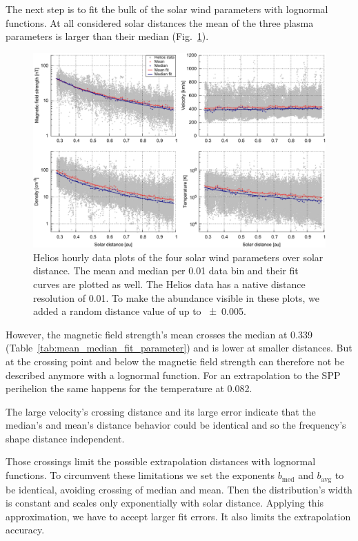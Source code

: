 The next step is to fit the bulk of the solar wind parameters with lognormal functions. At all considered solar distances the mean of the three plasma parameters is larger than their median (Fig.~\ref{fig:radial_fit_4_thesis_light_skip_pdfcairo_plot}).
\begin{figure}
	\includegraphics[width=18cm]{figures/radial_fit_4_thesis_light_skip_pdfcairo_plot.pdf}
	\caption{Helios hourly data plots of the four solar wind parameters over solar distance. The mean and median per \SI{0.01}{\au} data bin and their fit curves are plotted as well. The Helios data has a native distance resolution of \SI{0.01}{\au}. To make the abundance visible in these plots, we added a random distance value of up to \SI{+-0.005}{\au}.}
	\label{fig:radial_fit_4_thesis_light_skip_pdfcairo_plot}
\end{figure}
However, the magnetic field strength's mean crosses the median at \SI{0.339}{\au} (Table~\ref{tab:mean_median_fit_parameter}) and is lower at smaller distances. But at the crossing point and below the magnetic field strength can therefore not be described anymore with a lognormal function. For an extrapolation to the SPP perihelion the same happens for the temperature at \SI{0.082}{\au}.

The large velocity's crossing distance and its large error indicate that the median's and mean's distance behavior could be identical and so the frequency's shape distance independent.

Those crossings limit the possible extrapolation distances with lognormal functions. To circumvent these limitations we set the exponents $b_\text{med}$ and $b_\text{avg}$ to be identical, avoiding crossing of median and mean. Then the distribution's width is constant and scales only exponentially with solar distance. Applying this approximation, we have to accept larger fit errors. It also limits the extrapolation accuracy.

